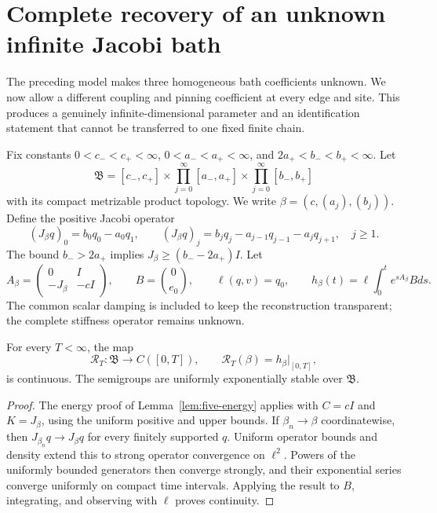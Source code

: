
\section{Complete recovery of an unknown infinite Jacobi bath}
\label{sec:infinite-jacobi}

The preceding model makes three homogeneous bath coefficients unknown.  We
now allow a different coupling and pinning coefficient at every edge and
site.  This produces a genuinely infinite-dimensional parameter and an
identification statement that cannot be transferred to one fixed finite
chain.

Fix constants \(0<c_-<c_+<\infty\), \(0<a_-<a_+<\infty\), and
\(2a_+<b_-<b_+<\infty\).  Let
\begin{equation}
 \mathfrak B=[c_-,c_+]
 \times\prod_{j=0}^\infty[a_-,a_+]
 \times\prod_{j=0}^\infty[b_-,b_+]
 \label{eq:jacobi-parameter}
\end{equation}
with its compact metrizable product topology.  We write
\(\beta=(c,(a_j),(b_j))\).  Define the positive Jacobi operator
\begin{equation}
 (J_\beta q)_0=b_0q_0-a_0q_1,
 \qquad
 (J_\beta q)_j=b_jq_j-a_{j-1}q_{j-1}-a_jq_{j+1},\quad j\ge1.
 \label{eq:jacobi-operator}
\end{equation}
The bound \(b_->2a_+\) implies
\(J_\beta\ge(b_--2a_+)I\).  Let
\[
 A_\beta=\begin{pmatrix}0&I\\-J_\beta&-cI\end{pmatrix},
 \qquad B=\binom0{e_0},\qquad\ell(q,v)=q_0,
 \qquad h_\beta(t)=\ell\int_0^te^{sA_\beta}Bds.
\]
The common scalar damping is included to keep the reconstruction transparent;
the complete stiffness operator remains unknown.

\begin{lemma}
\label{lem:product-continuity}
For every \(T<\infty\), the map
\[
 \mathcal R_T:\mathfrak B\to C([0,T]),
 \qquad \mathcal R_T(\beta)=h_\beta|_{[0,T]},
\]
is continuous.  The semigroups are uniformly exponentially stable over
\(\mathfrak B\).
\end{lemma}

\begin{proof}
The energy proof of Lemma~\ref{lem:five-energy} applies with
\(C=cI\) and \(K=J_\beta\), using the uniform positive and upper bounds.
If \(\beta_n\to\beta\) coordinatewise, then
\(J_{\beta_n}q\to J_\beta q\) for every finitely supported \(q\).  Uniform
operator bounds and density extend this to strong operator convergence on
\(\ell^2\).  Powers of the uniformly bounded generators then converge
strongly, and their exponential series converge uniformly on compact time
intervals.  Applying the result to \(B\), integrating, and observing with
\(\ell\) proves continuity.
\end{proof}

